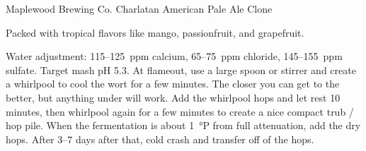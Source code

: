 \begin{recipe}{Maplewood Brewing Co. Charlatan American Pale Ale Clone}

\begin{aboutblock}
Packed with tropical flavors like mango, passionfruit, and grapefruit. \sourceaha
\end{aboutblock}


\begin{methodandtiming}
 
\begin{mashsteps}
\end{mashsteps}

\begin{directions}
Water adjustment: 115--125~ppm calcium, 65--75~ppm chloride, 145--155~ppm
sulfate. Target mash pH 5.3. At flameout, use a large spoon or stirrer and
create a whirlpool to cool the wort for a few minutes. The closer you can get
to  the better, but anything under  will work. Add the
whirlpool hops and let rest 10 minutes, then whirlpool again for a few minutes
to create a nice compact trub / hop pile. When the fermentation is about 1~°P
from full attenuation, add the dry hops. After 3--7 days after that,
cold crash and transfer off of the hops.
\end{directions}

\end{methodandtiming}

\recipebreak

\begin{ingredientsblock}

\begin{malts}
\end{malts}

\begin{hops}
\end{hops}


\end{ingredientsblock}

\end{recipe}